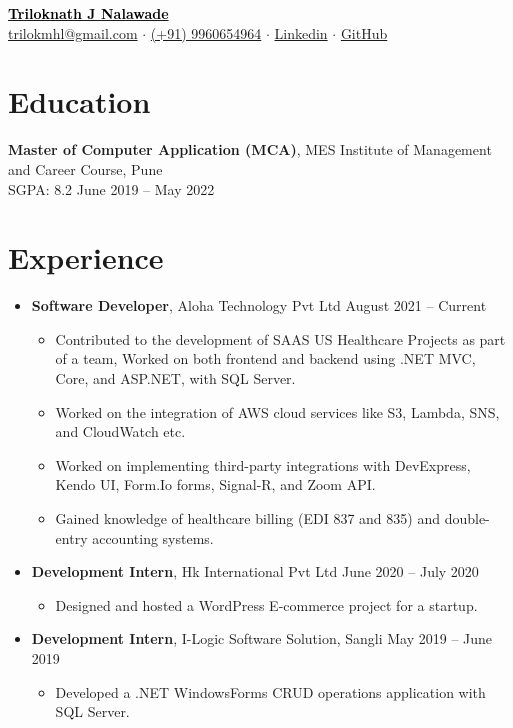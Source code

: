 \documentclass[letterpaper,11pt]{article}
\begin{document}
\begin{center}
     \href{https://dev-trilok.github.io/portfolio/}{\Huge \textbf{\textcolor{black}{Triloknath J Nalawade}}} \\
    \vspace{0.1in}
    \href{mailto:trilokmhl@gmail.com}{trilokmhl@gmail.com} $\cdot$ \href{tel:+919960654964}{(+91) 9960654964}
 $\cdot$ \href{https://linkedin.com/in/triloknath-nalawade/}{Linkedin} $\cdot$ \href{https://dev-trilok.github.io/portfolio/}{GitHub}
\end{center}

\section*{Education}
\textbf{Master of Computer Application (MCA)}, MES Institute of Management and Career Course, Pune \\
SGPA: 8.2 \hfill June 2019 -- May 2022

\section*{Experience}
\begin{itemize}[leftmargin=*]
    \item \textbf{Software Developer}, Aloha Technology Pvt Ltd \hfill August 2021 -- Current
    \begin{itemize}[leftmargin=*]
        \item Contributed to the development of SAAS US Healthcare Projects as part of a team, Worked on both frontend and backend using .NET MVC, Core, and ASP.NET, with  SQL Server.
        \item Worked on the integration of AWS cloud services like S3, Lambda, SNS, and CloudWatch etc.
        \item Worked on implementing third-party integrations with DevExpress, Kendo UI, Form.Io forms, Signal-R, and Zoom API.
        \item Gained knowledge of healthcare billing (EDI 837 and 835) and double-entry accounting systems.
    \end{itemize}

    \item \textbf{Development Intern}, Hk International Pvt Ltd \hfill June 2020 -- July 2020 \
    \begin{itemize}[leftmargin=*]
        \item Designed and hosted a WordPress E-commerce project for a startup.
    \end{itemize}

    \item \textbf{Development Intern}, I-Logic Software Solution, Sangli \hfill May 2019 -- June 2019 \
    \begin{itemize}[leftmargin=*]
        \item Developed a .NET WindowsForms CRUD operations application with SQL Server.
    \end{itemize}
\end{itemize}
\end{document}
